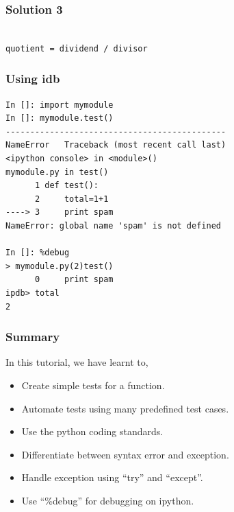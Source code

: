 \documentclass[presentation]{beamer}
\begin{document}
\begin{frame}[fragile]
\frametitle{Solution 3}
\label{sec-15}

\lstset{language=Python}
\begin{lstlisting}

quotient = dividend / divisor
\end{lstlisting}
\end{frame}
\begin{frame}[fragile]
\frametitle{Using idb}
\label{sec-16}

\small
\begin{lstlisting}
In []: import mymodule
In []: mymodule.test()
---------------------------------------------
NameError   Traceback (most recent call last)
<ipython console> in <module>()
mymodule.py in test()
      1 def test():
      2     total=1+1
----> 3     print spam
NameError: global name 'spam' is not defined

In []: %debug
> mymodule.py(2)test()
      0     print spam
ipdb> total
2
\end{lstlisting}
\end{frame}
\begin{frame}
\frametitle{Summary}
\label{sec-17}

 In this tutorial, we have learnt to, 
        

\begin{itemize}
\item Create simple tests for a function.
\item Automate tests using many predefined test cases.
\item Use the python coding standards.
\item Differentiate between syntax error and exception.
\item Handle exception using ``try'' and ``except''.
\item Use ``\%debug'' for debugging on ipython.
\end{itemize}
\end{frame}
\end{document}
